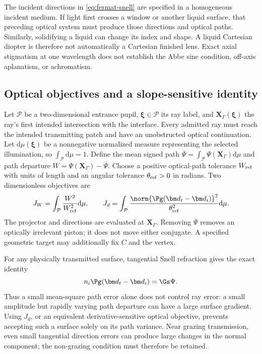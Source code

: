 The incident directions in \cref{eq:fermat-snell} are specified in a homogeneous
incident medium. If light first crosses a window or another liquid surface,
that preceding optical system must produce those directions and optical paths.
Similarly, solidifying a liquid can change its index and shape. A liquid
Cartesian diopter is therefore not automatically a Cartesian finished lens.
Exact axial stigmatism at one wavelength does not establish the Abbe sine
condition, off-axis aplanatism, or achromatism.

\subsection{Optical objectives and a slope-sensitive identity}
Let $\mathcal P$ be a two-dimensional entrance pupil, $\bm\xi\in\mathcal P$ its
ray label, and $\bm X_\Gamma(\bm\xi)$ the ray's first intended intersection with
the interface. Every admitted ray must reach the intended transmitting patch
and have an unobstructed optical continuation. Let $\mathrm d\mu(\bm\xi)$ be a nonnegative normalized measure
representing the selected illumination, so $\int_{\mathcal P}\mathrm d\mu=1$.
Define the mean signed path $\overline\Psi=\int_{\mathcal P}
\Psi(\bm X_\Gamma)\mathrm d\mu$ and path departure
$W=\Psi(\bm X_\Gamma)-\overline\Psi$. Choose a positive optical-path tolerance
$W_{\rm ref}$ with units of length and an angular tolerance
$\theta_{\rm ref}>0$ in radians. Two dimensionless objectives are
\begin{equation}
 J_W=\int_{\mathcal P}\frac{W^2}{W_{\rm ref}^2}\mathrm d\mu,
 \qquad
 J_d=\int_{\mathcal P}
 \frac{\norm{\Pg(\bm d_t-\bm d_i)}^2}{\theta_{\rm ref}^2}\mathrm d\mu.
 \label{eq:optical-objectives}
\end{equation}
The projector and directions are evaluated at $\bm X_\Gamma$. Removing
$\overline\Psi$ removes an optically irrelevant piston; it does not move either
conjugate. A specified geometric target may additionally fix $C$ and the vertex.

For any physically transmitted surface, tangential Snell refraction gives the
exact identity
\begin{equation}
 n_i\Pg(\bm d_t-\bm d_i)=\Gs\Psi.
 \label{eq:opd-slope-identity}
\end{equation}
Thus a small mean-square path error alone does not control ray error: a small
amplitude but rapidly varying path departure can have a large surface gradient.
Using $J_d$, or an equivalent derivative-sensitive optical objective, prevents
accepting such a surface solely on its path variance. Near grazing transmission,
even small tangential direction errors can produce large changes in the normal
component; the non-grazing condition must therefore be retained.

